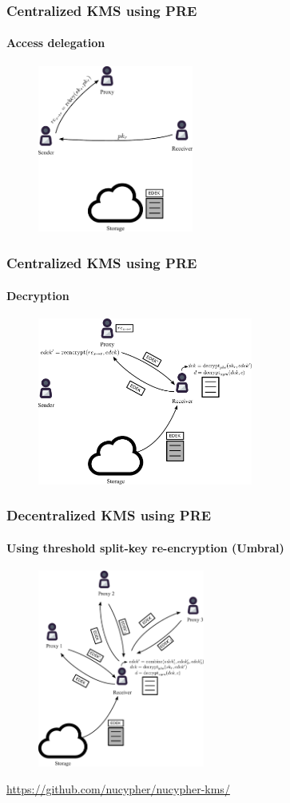 \documentclass[xetex,mathsans,sans]{beamer}
\begin{document}
    \begin{frame}
        \frametitle{Centralized KMS using PRE}
        \framesubtitle{Access delegation}
        \begin{figure}
            \centering
            \includegraphics[height=5.5cm]{pdf/delegate.pdf}
        \end{figure}
    \end{frame}

    \begin{frame}
        \frametitle{Centralized KMS using PRE}
        \framesubtitle{Decryption}
        \begin{figure}
            \centering
            \includegraphics[height=5.5cm]{pdf/decrypt.pdf}
        \end{figure}
    \end{frame}

    \begin{frame}
        \frametitle{Decentralized KMS using PRE}
        \framesubtitle{Using threshold split-key re-encryption (Umbral)}
        \begin{figure}
            \centering
            \includegraphics[height=6.5cm]{pdf/decrypt-umbral.pdf}
        \end{figure}
        \url{https://github.com/nucypher/nucypher-kms/}
    \end{frame}
\end{document}
